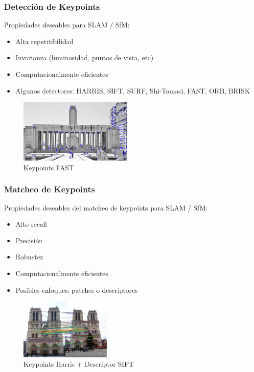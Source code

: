 \begin{frame}
	\frametitle{Detección de Keypoints}
	
	
	
	\footnotesize
	Propiedades deseables para SLAM / SfM:
	\begin{itemize}
		\item Alta repetitibilidad
		\item Invarianza (luminosidad, puntos de vista, etc)
		\item Computacionalmente eficientes
		\item Algunos detectores: HARRIS, SIFT, SURF, Shi-Tomasi, FAST, ORB, BRISK
	\end{itemize}

	
	\begin{figure}
		\includegraphics[width=0.5\textwidth]{./images/keypoints_fast}
		\caption{Keypoints FAST}
	\end{figure}

\end{frame}


\begin{frame}
	\frametitle{Matcheo de Keypoints}
	\footnotesize
	Propiedades deseables del matcheo de keypoints para SLAM / SfM:
	\begin{itemize}
		\item Alto recall
		\item Precisión
		\item Robustez
		\item Computacionalmente eficientes
		\item Posibles enfoques: patches o descriptores
	\end{itemize}
	
	\begin{figure}
		\includegraphics[width=0.4\textwidth]{./images/matching_notredam.jpg}
		\caption{Keypoints Harris + Descriptor SIFT}
	\end{figure}
\end{frame}

